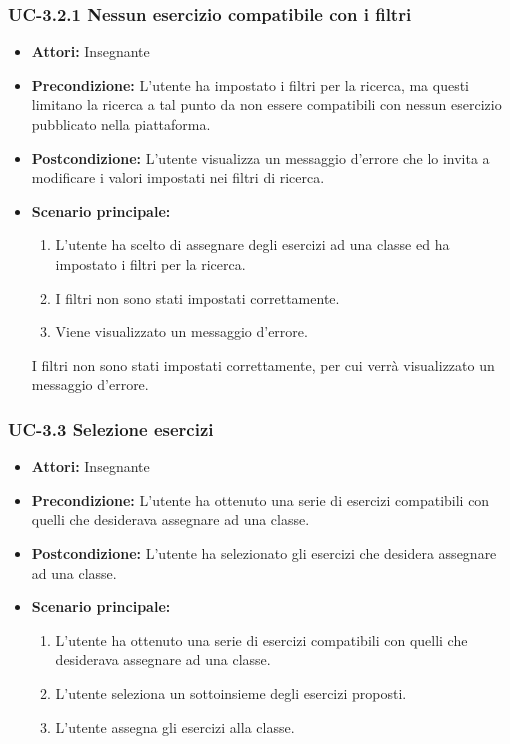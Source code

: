 \subsubsection{UC-3.2.1 Nessun esercizio compatibile con i filtri}
\begin{itemize}
		\item \textbf{Attori: } Insegnante
		\item \textbf{Precondizione: }L'utente ha impostato i filtri per la ricerca, ma questi limitano la ricerca a tal punto da non essere compatibili con nessun esercizio pubblicato nella piattaforma.
		\item \textbf{Postcondizione: }L'utente visualizza un messaggio d'errore che lo invita a modificare i valori impostati nei filtri di ricerca.
		\item \textbf{Scenario principale: }
		\begin{enumerate}
		\item L'utente ha scelto di assegnare degli esercizi ad una classe ed ha impostato i filtri per la ricerca.
		\item I filtri non sono stati impostati correttamente.
		\item Viene visualizzato un messaggio d'errore.
		\end{enumerate} I filtri non sono stati impostati correttamente, per cui verrà visualizzato un messaggio d'errore.
\end{itemize}
\subsubsection{UC-3.3 Selezione esercizi}
\begin{itemize}
		\item \textbf{Attori: } Insegnante
		\item \textbf{Precondizione: }L'utente ha ottenuto una serie di esercizi compatibili con quelli che desiderava assegnare ad una classe.
		\item \textbf{Postcondizione: }L'utente ha selezionato gli esercizi che desidera assegnare ad una classe.
		\item \textbf{Scenario principale: }
		\begin{enumerate}
			\item L'utente ha ottenuto una serie di esercizi compatibili con quelli che desiderava assegnare ad una classe. 
			\item L'utente seleziona un sottoinsieme degli esercizi proposti.
			\item L'utente assegna gli esercizi alla classe.
		\end{enumerate}
\end{itemize}
